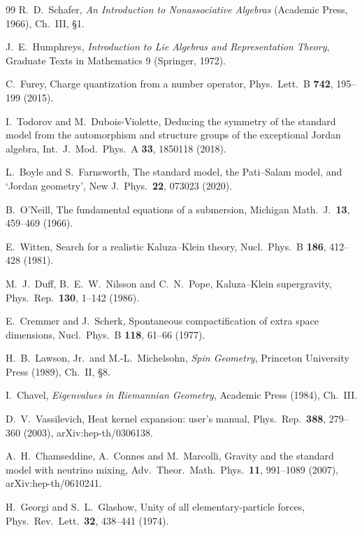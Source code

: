 \documentclass[aps,pra,onecolumn,superscriptaddress,nofootinbib,10pt]{revtex4-2}
\theoremstyle{definition}
\theoremstyle{remark}
\begin{document}
\begin{thebibliography}{99}
 R.~D.~Schafer, \emph{An Introduction to Nonassociative Algebras} (Academic Press, 1966), Ch.~III, \S1.

 J.~E.~Humphreys, \emph{Introduction to Lie Algebras and Representation Theory}, Graduate Texts in Mathematics 9 (Springer, 1972).



 C.~Furey, Charge quantization from a number operator, Phys.\ Lett.\ B \textbf{742}, 195--199 (2015).

 I.~Todorov and M.~Dubois-Violette, Deducing the symmetry of the standard model from the automorphism and structure groups of the exceptional Jordan algebra, Int.\ J.\ Mod.\ Phys.\ A \textbf{33}, 1850118 (2018).

 L.~Boyle and S.~Farnsworth, The standard model, the Pati--Salam model, and `Jordan geometry', New J.\ Phys.\ \textbf{22}, 073023 (2020).

 B.~O'Neill, The fundamental equations of a submersion, Michigan Math.\ J.\ \textbf{13}, 459--469 (1966).

 E.~Witten, Search for a realistic Kaluza--Klein theory, Nucl.\ Phys.\ B \textbf{186}, 412--428 (1981).

 M.~J.~Duff, B.~E.~W.~Nilsson and C.~N.~Pope, Kaluza--Klein supergravity, Phys.\ Rep.\ \textbf{130}, 1--142 (1986).

 E.~Cremmer and J.~Scherk, Spontaneous compactification of extra space dimensions, Nucl.\ Phys.\ B \textbf{118}, 61--66 (1977).

 H.~B.~Lawson, Jr.\ and M.-L.~Michelsohn, \emph{Spin Geometry}, Princeton University Press (1989), Ch.~II, \S8.

 I.~Chavel, \emph{Eigenvalues in Riemannian Geometry}, Academic Press (1984), Ch.~III.

 D.~V.~Vassilevich, Heat kernel expansion: user's manual, Phys.\ Rep.\ \textbf{388}, 279--360 (2003), arXiv:hep-th/0306138.

 A.~H.~Chamseddine, A.~Connes and M.~Marcolli, Gravity and the standard model with neutrino mixing, Adv.\ Theor.\ Math.\ Phys.\ \textbf{11}, 991--1089 (2007), arXiv:hep-th/0610241.

 H.~Georgi and S.~L.~Glashow, Unity of all elementary-particle forces, Phys.\ Rev.\ Lett.\ \textbf{32}, 438--441 (1974).


\end{thebibliography}
\end{document}
